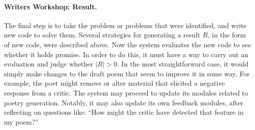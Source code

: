 
\paragraph{Writers Workshop: Result.} 

The final step is to take the problem or problems that were
identified, and write new code to solve them.  Several strategies for
generating a result $R$, in the form of new code, were described
above.  Now the system evaluates the new code to see whether it holds
promise.  In order to do this, it must have a way to carry out an
evaluation and judge whether $|R|>0$.  In the most straightforward
case, it would simply make changes to the draft poem that seem to
improve it in some way.  For example, the poet might remove or alter material that
elicited a negative response from a critic.  The system may proceed to
update its modules related to poetry generation.  Notably, it may also update its own
feedback modules, after reflecting on questions like: ``How might the
critic have detected that feature in my poem?''

